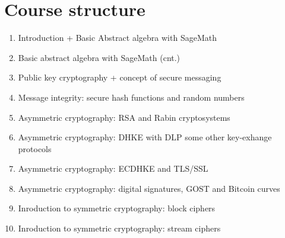 \documentclass{article}
\begin{document}
\section*{Course structure}
\begin{enumerate}
    \item Introduction + Basic Abstract algebra with SageMath
    \item Basic abstract algebra with SageMath (cnt.)
    \item Public key cryptography + concept of secure messaging %
    \item Message integrity: secure hash functions and random numbers
    \item Asymmetric cryptography: RSA and Rabin cryptosystems
    \item Asymmetric cryptography: DHKE with DLP some other key-exhange protocols 
    \item Asymmetric cryptography: ECDHKE and TLS/SSL
    \item Asymmetric cryptography: digital signatures, GOST and Bitcoin curves
    \item Inroduction to symmetric cryptography: block ciphers
    \item Inroduction to symmetric cryptography: stream ciphers
\end{enumerate}
\end{document}
